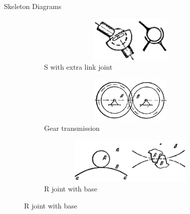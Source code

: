 \documentclass[aspectratio=169]{beamer}
\begin{document}
\begin{frame}[t]{Skeleton Diagrams}
\begin{figure}[H]
\begin{subfigure}{0.32\textwidth}
    \centering\includegraphics[height=2.2cm,width=1\textwidth,keepaspectratio]{Smin_sd.png}
    \caption*{S with extra link joint}
\end{subfigure}
\begin{subfigure}{0.32\textwidth}
    \centering\includegraphics[height=2.2cm,width=1\textwidth,keepaspectratio]{Tooth_sd.png}
    \caption*{Gear transmission}
\end{subfigure}
\begin{subfigure}{0.32\textwidth}
    \centering\includegraphics[height=2.2cm,width=1\textwidth,keepaspectratio]{Higher_sd.png}
    \caption*{R joint with base}
\end{subfigure}
\end{figure}
\end{frame}
\end{document}
